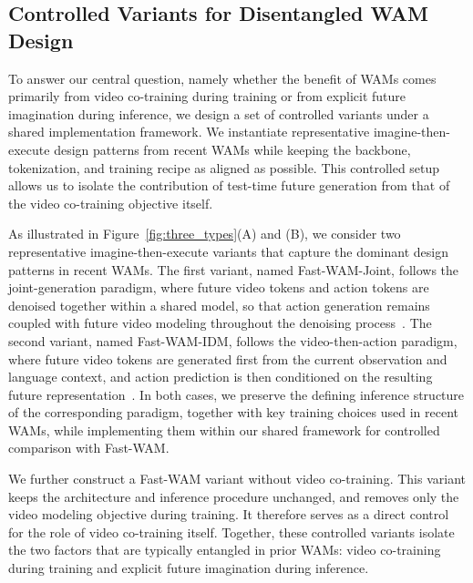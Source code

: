 \subsection{Controlled Variants for Disentangled WAM Design}
\label{sec:controlled_variants}

To answer our central question, namely whether the benefit of WAMs comes primarily from video co-training during training or from explicit future imagination during inference, we design a set of controlled variants under a shared implementation framework. We instantiate representative imagine-then-execute design patterns from recent WAMs while keeping the backbone, tokenization, and training recipe as aligned as possible. This controlled setup allows us to isolate the contribution of test-time future generation from that of the video co-training objective itself.

As illustrated in Figure~\ref{fig:three_types}(A) and (B), we consider two representative imagine-then-execute variants that capture the dominant design patterns in recent WAMs. The first variant, named Fast-WAM-Joint, follows the joint-generation paradigm, where future video tokens and action tokens are denoised together within a shared model, so that action generation remains coupled with future video modeling throughout the denoising process~\cite{ye2026worldactionmodelszeroshot, zhu2025unifiedworldmodelscoupling, bi2025motusunifiedlatentaction}. The second variant, named Fast-WAM-IDM, follows the video-then-action paradigm, where future video tokens are generated first from the current observation and language context, and action prediction is then conditioned on the resulting future representation~\cite{lingbot-va2026, feng2025vidarembodiedvideodiffusion, du2023learninguniversalpoliciestextguided}. In both cases, we preserve the defining inference structure of the corresponding paradigm, together with key training choices used in recent WAMs, while implementing them within our shared framework for controlled comparison with Fast-WAM.

We further construct a Fast-WAM variant without video co-training. This variant keeps the architecture and inference procedure unchanged, and removes only the video modeling objective during training. It therefore serves as a direct control for the role of video co-training itself. Together, these controlled variants isolate the two factors that are typically entangled in prior WAMs: video co-training during training and explicit future imagination during inference.
